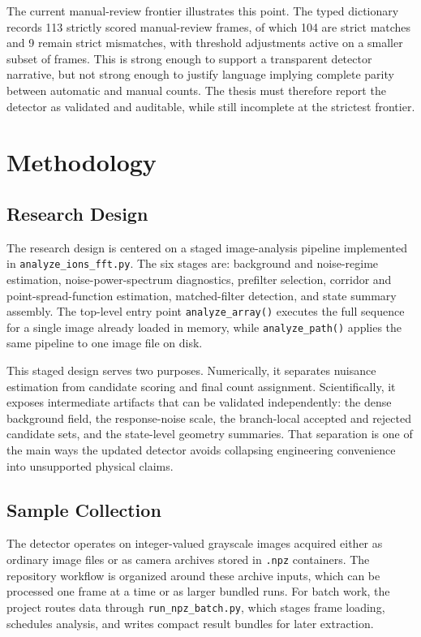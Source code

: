 \documentclass[12pt]{report}
\begin{document}
The current manual-review frontier illustrates this point. The typed dictionary records 113 strictly scored manual-review frames, of which 104 are strict matches and 9 remain strict mismatches, with threshold adjustments active on a smaller subset of frames. This is strong enough to support a transparent detector narrative, but not strong enough to justify language implying complete parity between automatic and manual counts. The thesis must therefore report the detector as validated and auditable, while still incomplete at the strictest frontier.

\chapter{Methodology}

\section{Research Design}

The research design is centered on a staged image-analysis pipeline implemented in \texttt{analyze\_ions\_fft.py}. The six stages are: background and noise-regime estimation, noise-power-spectrum diagnostics, prefilter selection, corridor and point-spread-function estimation, matched-filter detection, and state summary assembly. The top-level entry point \texttt{analyze\_array()} executes the full sequence for a single image already loaded in memory, while \texttt{analyze\_path()} applies the same pipeline to one image file on disk.

This staged design serves two purposes. Numerically, it separates nuisance estimation from candidate scoring and final count assignment. Scientifically, it exposes intermediate artifacts that can be validated independently: the dense background field, the response-noise scale, the branch-local accepted and rejected candidate sets, and the state-level geometry summaries. That separation is one of the main ways the updated detector avoids collapsing engineering convenience into unsupported physical claims.

\section{Sample Collection}

The detector operates on integer-valued grayscale images acquired either as ordinary image files or as camera archives stored in \texttt{.npz} containers. The repository workflow is organized around these archive inputs, which can be processed one frame at a time or as larger bundled runs. For batch work, the project routes data through \texttt{run\_npz\_batch.py}, which stages frame loading, schedules analysis, and writes compact result bundles for later extraction.
\end{document}
